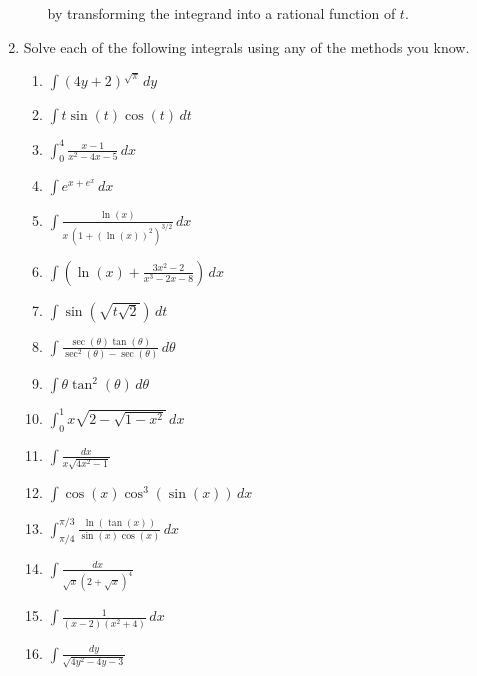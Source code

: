 \documentclass[12 pt]{article}
\begin{document}
\begin{enumerate}[leftmargin=0in, rightmargin=-0.25in]
\begin{enumerate}
{\begin{enumerate}
			by transforming the integrand into a rational function of $t$.
		\end{enumerate}}
	\end{enumerate}
	\newpage
	\item Solve each of the following integrals using any of the methods you know.
	\begin{multicols}{2}
		\begin{enumerate}
			\setlength{\itemsep}{0.625in}
			\item $\int(4y+2)^{\sqrt{\pi}}\,dy$
			\item $\int t\sin(t)\cos(t)\,dt$
			\item $\int_0^4\frac{x-1}{x^2-4x-5}\,dx$
			\item $\int e^{x+e^x}\,dx$
			\item $\int\frac{\ln(x)}{x\,(1+(\ln(x))^2)^{3/2}}\,dx$
			\item $\int\left(\ln(x)+\frac{3x^2-2}{x^3-2x-8}\right)\,dx$
			\item $\int\sin\left(\sqrt{t \sqrt{2}}\right)\,dt$
			\item $\int\frac{\sec(\theta)\tan(\theta)}{\sec^2(\theta)-\sec(\theta)}\,d\theta$
			\item $\int\theta\tan^2(\theta)\,d\theta$
			\item $\int_0^1 x\sqrt{2-\sqrt{1-x^2}}\,dx$
			\item $\int\frac{dx}{x\sqrt{4x^2-1}}$
			\item $\int\cos(x)\cos^3(\sin(x))\,dx$
			\item $\int_{\pi/4}^{\pi/3}\frac{\ln(\tan(x))}{\sin(x)\cos(x)}\,dx$
			\item $\int\frac{dx}{\sqrt{x}(2+\sqrt{x})^4}$
			\item $\int\frac{1}{(x-2)(x^2+4)}\,dx$
			\item $\int\frac{dy}{\sqrt{4y^2-4y-3}}$
		\end{enumerate}
	\end{multicols}
\end{enumerate}
\end{document}
